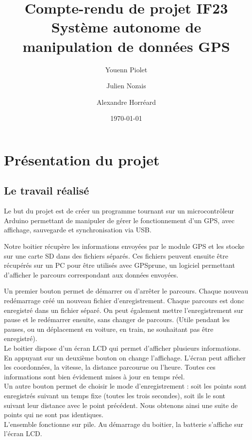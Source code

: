 \documentclass[a4paper,12pt,titlepage]{article}
\title{Compte-rendu de projet IF23\\Système autonome de manipulation de données GPS}
\author{Youenn Piolet \and Julien Nozais \and Alexandre Horréard}
\date{\today} %
\begin{document}
\maketitle

\tableofcontents

\newpage

\section{Présentation du projet}

\subsection{Le travail réalisé}

Le but du projet est de créer un programme tournant sur un microcontrôleur
Arduino permettant de manipuler de gérer le fonctionnement d'un GPS, avec
affichage, sauvegarde et synchronisation via USB.

Notre boitier récupère les informations envoyées par le module GPS et les
stocke sur une carte SD dans des fichiers séparés. Ces fichiers peuvent
ensuite être récupérés sur un PC pour être utilisés avec GPSprune, un
logiciel permettant d'afficher le parcours correspondant aux données envoyées.

\bigskip
Un premier bouton permet de démarrer ou d'arrêter le parcours. Chaque nouveau
redémarrage créé un nouveau fichier d'enregistrement. Chaque parcours
est donc enregistré dans un fichier séparé. On peut également mettre
l'enregistrement sur pause et le redémarrer ensuite, sans changer de parcours.
(Utile pendant les pauses, ou un déplacement en voiture, en train, ne souhaitant
pas être enregistré).
\\
Le boitier dispose d'un écran LCD qui permet d'afficher plusieurs informations.
En appuyant sur un deuxième bouton on change l'affichage. L'écran peut afficher
les coordonnées, la vitesse, la distance parcourue ou l'heure. Toutes ces
informations sont bien évidement mises à jour en temps réel.
\\
Un autre bouton permet de choisir le mode d'enregistrement : soit les points
sont enregistrés suivant un temps fixe (toutes les trois secondes), soit ils le
sont suivant leur distance avec le point précédent. Nous obtenons ainsi une
suite de points qui ne sont pas identiques.
\\
L'ensemble fonctionne sur pile. Au démarrage du boitier, la batterie s'affiche
sur l'écran LCD.
\end{document}
